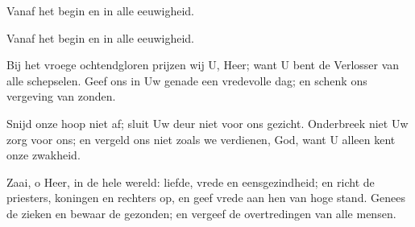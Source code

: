 \documentclass[12pt,twoside,a5paper]{article}
\begin{document}
\begin{doublecols}
  \textsizexi

  \dutchl Vanaf het begin en in alle eeuwigheid.

   Vanaf het begin en in alle eeuwigheid.

  \dutchl \begin{halfparskip}
    Bij het vroege ochtendgloren prijzen wij U, Heer; want U bent de Verlosser van alle schepselen. Geef ons in Uw genade een vredevolle dag; en schenk ons vergeving van zonden.

    Snijd onze hoop niet af; sluit Uw deur niet voor ons gezicht. Onderbreek niet Uw zorg voor ons; en vergeld ons niet zoals we verdienen, God, want U alleen kent onze zwakheid.

    Zaai, o Heer, in de hele wereld: liefde, vrede en eensgezindheid; en richt de priesters, koningen en rechters op, en geef vrede aan hen van hoge stand. Genees de zieken en bewaar de gezonden; en vergeef de overtredingen van alle mensen.
  \end{halfparskip}

   \begin{halfparskip}


  \end{halfparskip}
\end{doublecols}
\end{document}
